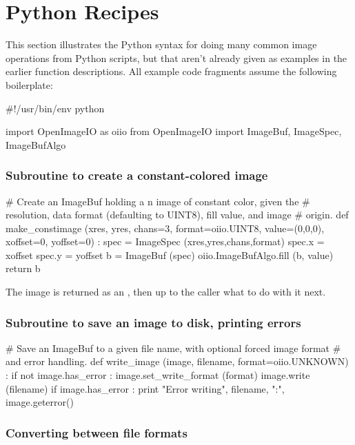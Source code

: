 \section{Python Recipes}
\label{sec:pythonrecipes}

This section illustrates the Python syntax for doing many common image
operations from Python scripts, but that aren't already given as examples
in the earlier function descriptions.  All example code fragments assume the
following boilerplate:

\begin{code}
    #!/usr/bin/env python 
    
    import OpenImageIO as oiio
    from OpenImageIO import ImageBuf, ImageSpec, ImageBufAlgo
\end{code}


\subsubsection*{Subroutine to create a constant-colored image}
\begin{code}
    # Create an ImageBuf holding a n image of constant color, given the
    # resolution, data format (defaulting to UINT8), fill value, and image
    # origin.
    def make_constimage (xres, yres, chans=3, format=oiio.UINT8, value=(0,0,0),
                         xoffset=0, yoffset=0) :
        spec = ImageSpec (xres,yres,chans,format)
        spec.x = xoffset
        spec.y = yoffset
        b = ImageBuf (spec)
        oiio.ImageBufAlgo.fill (b, value)
        return b
\end{code}

\noindent The image is returned as an \ImageBuf, then up to the caller 
what to do with it next.

\subsubsection*{Subroutine to save an image to disk, printing errors}
\begin{code}
    # Save an ImageBuf to a given file name, with optional forced image format
    # and error handling.
    def write_image (image, filename, format=oiio.UNKNOWN) :
        if not image.has_error :
            image.set_write_format (format)
            image.write (filename)
        if image.has_error :
            print "Error writing", filename, ":", image.geterror()
\end{code}


\subsubsection*{Converting between file formats}

